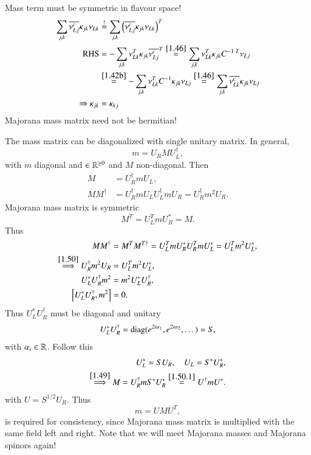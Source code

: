 Mass term must be symmetric in flavour space!
\begin{align}
   \sum_{j,k} \overline{\nu^c_{Lj}} \kappa_{jk} \nu_{Lk} &\stackrel{!}{=} \sum_{j,k} \left( \overline{\nu^c_{Lj}} \kappa_{jk} \nu_{Lk} \right)^T \notag \\ 
   \text{RHS} &= - \sum_{j,k} \nu^T_{Lk} \kappa_{jk} \overline{\nu^c_{Lj}}^T \stackrel{\ref{1.46}}{=} \sum_{j,k} \nu_{Lk}^T \kappa_{jk} C^{-1 \; T} \nu_{Lj} \notag \\
              &\stackrel{\ref{1.42b}}{=} - \sum_{j,k} \nu_{Lk}^T C^{-1} \kappa_{jk} \nu_{Lj} \stackrel{\ref{1.46}}{=} \sum_{j,k} \overline{\nu^c_{Lk}} \kappa_{jk} \nu_{Lj} \notag \\
   \Rightarrow \kappa_{jk} &= \kappa_{kj}  \label{1.47}
\end{align}
Majorana mass matrix need not be hermitian!

The mass matrix can be diagonalized with single unitary matrix. In general,
\begin{equation}
   m = U_R M U_L^\dagger,
\end{equation}
with $m$ diagonal and $\in \mathbb{R}^{\geq 0}$ and $M$ non-diagonal. Then
\begin{align}
   M &= U_R^\dagger m U_L, \label{1.49}  \\
   M M^\dagger &= U_R^\dagger m U_L U_L^\dagger m U_R = U_R^\dagger m^2 U_R. \label{1.50}
\end{align}
Majorana mass matrix is symmetric
\begin{equation}
   M^T = U_L^T m U_R^* = M. 
\end{equation}
Thus
\begin{align}
   M M^\dagger &= M^T M^{T\dagger} = U_L^T m U_R^* U_R^T m U_L^* = U_L^T m^2 U_L^*, \notag \\
   \stackrel{\ref{1.50}}{\Longrightarrow}U_R^\dagger m^2 U_R &= U_L^T m^2 U_L^*, \notag \\
   U_L^* U_R^\dagger m^2 &= m^2 U_L^* U_R^\dagger, \notag \\
   \comm{U_L^* U_R^\dagger}{m^2} &= 0. \label{1.50.1}
\end{align}
Thus $U_L^* U_R^\dagger$ must be diagonal and unitary
\begin{align*}
   U_L^* U_R^\dagger = \text{diag}(e^{2i\alpha_1}, e^{2i\alpha_2}, \dots) = S,
\end{align*}
with $\alpha_i \in \mathbb{R}$. Follow this
\begin{align}
   U_L^* = S U_R, \quad U_L = S^* U_R^*, \notag \\
   \stackrel{\ref{1.49}}{\Longrightarrow} M = U_R^\dagger m S^* U_R^* \stackrel{\ref{1.50.1}}{=} U^{\dagger} m U^*. \label{1.51}
\end{align}
with $U = S^{1/2} U_R $.  Thus
\begin{equation}
   m = U M U^T, \label{1.52}
\end{equation}
is required for consistency, since Majorana mass matrix is multiplied with the same field left and right. Note that we will meet Majorana masses and Majorana spinors again!


